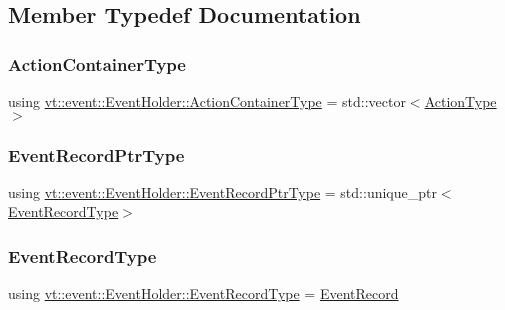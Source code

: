 \subsection{Member Typedef Documentation}
\mbox{\label{structvt_1_1event_1_1_event_holder_ae0e2d5fe3bd5792118116105a0a09db7}} 
\subsubsection{\texorpdfstring{Action\+Container\+Type}{ActionContainerType}}
{\footnotesize\ttfamily using \hyperlink{structvt_1_1event_1_1_event_holder_ae0e2d5fe3bd5792118116105a0a09db7}{vt\+::event\+::\+Event\+Holder\+::\+Action\+Container\+Type} =  std\+::vector$<$\hyperlink{namespacevt_ae0a5a7b18cc99d7b732cb4d44f46b0f3}{Action\+Type}$>$}

\mbox{\label{structvt_1_1event_1_1_event_holder_a89949c85549018aad229356105187d50}} 
\subsubsection{\texorpdfstring{Event\+Record\+Ptr\+Type}{EventRecordPtrType}}
{\footnotesize\ttfamily using \hyperlink{structvt_1_1event_1_1_event_holder_a89949c85549018aad229356105187d50}{vt\+::event\+::\+Event\+Holder\+::\+Event\+Record\+Ptr\+Type} =  std\+::unique\+\_\+ptr$<$\hyperlink{structvt_1_1event_1_1_event_holder_adfdec23d67b016b1f028694d5ca5bcff}{Event\+Record\+Type}$>$}

\mbox{\label{structvt_1_1event_1_1_event_holder_adfdec23d67b016b1f028694d5ca5bcff}} 
\subsubsection{\texorpdfstring{Event\+Record\+Type}{EventRecordType}}
{\footnotesize\ttfamily using \hyperlink{structvt_1_1event_1_1_event_holder_adfdec23d67b016b1f028694d5ca5bcff}{vt\+::event\+::\+Event\+Holder\+::\+Event\+Record\+Type} =  \hyperlink{structvt_1_1event_1_1_event_record}{Event\+Record}}



